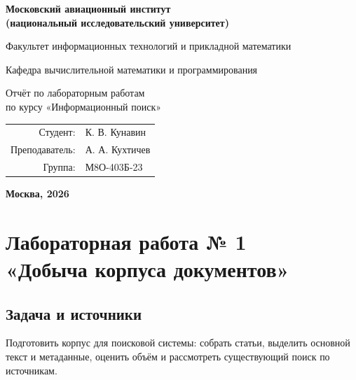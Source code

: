 \documentclass[12pt,a4paper]{article}
\renewcommand{\contentsname}{Содержание}
\renewcommand{\tablename}{Таблица}
\renewcommand{\figurename}{Рисунок}
\newcommand{\sub}[1]{\subsection{#1}}
\begin{document}
\renewcommand{\contentsname}{Содержание}
\renewcommand{\tablename}{Таблица}
\renewcommand{\figurename}{Рисунок}
\begin{titlepage}
\begin{center}\bfseries
{\Large Московский авиационный институт\\(национальный исследовательский университет)}
\vspace{18mm}

{\large Факультет информационных технологий и прикладной математики}
\vspace{12mm}

{\large Кафедра вычислительной математики и программирования}
\vspace{20mm}

{\large Отчёт по лабораторным работам\\по курсу «Информационный поиск»}
\vspace{8mm}

\end{center}
\vspace{24mm}
\begin{flushright}
\begin{tabular}{rl}
Студент: & К. В. Кунавин \\
Преподаватель: & А. А. Кухтичев \\
Группа: & М8О-403Б-23 \\
\end{tabular}
\end{flushright}
\vfill
\begin{center}\bfseries Москва, 2026\end{center}
\end{titlepage}
\tableofcontents
\clearpage
\section{Лабораторная работа № 1\\«Добыча корпуса документов»}
\sub{Задача и источники}
Подготовить корпус для поисковой системы: собрать статьи, выделить основной текст и метаданные, оценить объём и рассмотреть существующий поиск по источникам.
\end{document}

